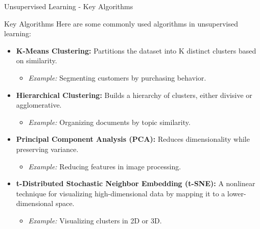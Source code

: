 \documentclass[aspectratio=169]{beamer}
\begin{document}
\begin{frame}[fragile]{Unsupervised Learning - Key Algorithms}
  \begin{block}{Key Algorithms}
    Here are some commonly used algorithms in unsupervised learning:
    \begin{itemize}
      \item \textbf{K-Means Clustering:} Partitions the dataset into K distinct clusters based on similarity.
        \begin{itemize}
          \item \textit{Example:} Segmenting customers by purchasing behavior.
        \end{itemize}

      \item \textbf{Hierarchical Clustering:} Builds a hierarchy of clusters, either divisive or agglomerative.
        \begin{itemize}
          \item \textit{Example:} Organizing documents by topic similarity.
        \end{itemize}

      \item \textbf{Principal Component Analysis (PCA):} Reduces dimensionality while preserving variance.
        \begin{itemize}
          \item \textit{Example:} Reducing features in image processing.
        \end{itemize}
      
      \item \textbf{t-Distributed Stochastic Neighbor Embedding (t-SNE):} A nonlinear technique for visualizing high-dimensional data by mapping it to a lower-dimensional space.
        \begin{itemize}
          \item \textit{Example:} Visualizing clusters in 2D or 3D.
        \end{itemize}
    \end{itemize}
  \end{block}
\end{frame}
\end{document}
